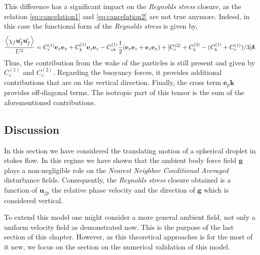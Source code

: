 This difference has a significant impact on the \textit{Reynolds stress} closure, as the relation \ref{eq:cancelation1} and \ref{eq:cancelation2} are not true anymore. 
Indeed, in this case the functional form of the \textit{Reynolds stress} is given by, 
\begin{equation}
    \frac{\left<\chi_f \textbf{u}_f'\textbf{u}_f'\right>}{U^2}
    = 
    C^{(1)}_e 
    \textbf{e}_x\textbf{e}_x
    +C^{(1)}_k    
    \textbf{e}_z\textbf{e}_z
    - C^{(1)}_{ek} 
        \frac{1}{2}
        (\textbf{e}_x\textbf{e}_z+ \textbf{e}_z \textbf{e}_x)
    + [C^{(2)}_e + C^{(2)}_k - (C^{(1)}_k + C^{(1)}_e )/3 ]  \bm\delta. 
\end{equation}
Thus, the contribution from the wake of the particles is still present and given by $C_e^{(1)}$ and $C_e^{(2)}$. 
Regarding the buoyancy forces, it provides additional contributions that are on the vertical direction. 
Finally, the cross term $\textbf{e}_p \textbf{k}$ provides off-diagonal terms. 
The isotropic part of this tensor is the sum of the aforementioned contributions. 

\subsection{Discussion}

In this section we have considered the translating motion of a spherical droplet in stokes flow. 
In this regime we have shown that the ambient body force field $\textbf{g}$ plays a non-negligible role on the \textit{Nearest Neighbor Conditional Averaged} disturbance fields. 
Consequently, the \textit{Reynolds stress} closure obtained is a function of $\textbf{u}_{fp}$ the relative phase velocity and the direction of $\textbf{g}$ which is considered vertical. 

To extend this model one might consider a more general ambient field, not only a uniform velocity field as demonstrated now. 
This is the purpose of the last section of this chapter. 
However, as this theoretical approaches is for the most of it new, we focus on the section on the numerical validation of this model. 
